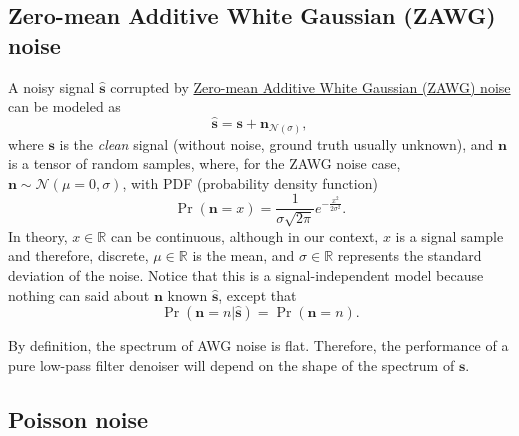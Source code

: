 \documentclass{article}
\begin{document}
\subsection{Zero-mean Additive White Gaussian (ZAWG) noise}

A noisy signal $\hat{\mathbf s}$ corrupted by \href{https://en.wikipedia.org/wiki/Gaussian_noise}{Zero-mean Additive White Gaussian (ZAWG) noise} can be modeled as
\begin{equation}
  \hat{\mathbf s} = {\mathbf s} + {\mathbf n}_{{\mathcal N}(\sigma)},
  \label{eq:AWG_noise_model}  
\end{equation}
where $\mathbf{s}$ is the \emph{clean} signal (without noise, ground
truth usually unknown),
and ${\mathbf n}$ is a tensor of random samples,
where, for the ZAWG noise case,
${\mathbf n}\sim{\mathcal N}(\mu=0,\sigma)$, with PDF (probability density
function)
\begin{equation}
  \Pr({\mathbf n}{=}x) = \frac 1 {\sigma\sqrt{2\pi}} e^{-\frac{x^2}{2\sigma^2} }.
\end{equation}
In theory, $x\in\mathbb{R}$ can be continuous, although in our
context, $x$ is a signal sample and therefore, discrete,
$\mu\in\mathbb{R}$ is the mean, and $\sigma\in\mathbb{R}$ represents
the standard deviation of the noise. Notice that this is a
signal-independent model because nothing can said about ${\mathbf n}$
known $\hat{\mathbf s}$, except that
\begin{equation}
  \Pr(\mathbf{n}{=}n|\hat{\mathbf{s}}) = \Pr(\mathbf{n}{=}n).
\end{equation}

By definition, the spectrum of AWG noise is flat. Therefore, the
performance of a pure low-pass filter denoiser will depend on the
shape of the spectrum of $\mathbf{s}$.


\subsection{Poisson noise}
\end{document}
